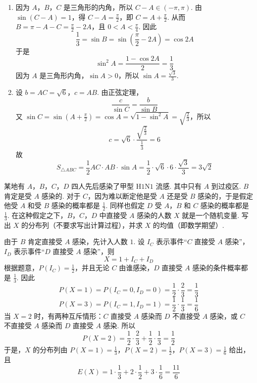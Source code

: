 \begin{solution}
\begin{enumerate}
\item 因为 \(A\)，\(B\)，\(C\) 是三角形的内角，所以 \(C-A\in(-\pi,\pi)\). 由 \(\sin(C-A)=1\)，得 \(C-A=\frac{\pi}{2}\)，即 \(C=A+\frac{\pi}{2}\). 从而 \(B=\pi-A-C=\frac{\pi}{2}-2A\)，且 \(0<A<\frac{\pi}{4}\). 因此
\[
\frac{1}{3}=\sin B=\sin\left(\frac{\pi}{2}-2A\right)=\cos 2A
\]
于是
\[
\sin^{2}A=\frac{1-\cos 2A}{2}=\frac{1}{3}
\]
因为 \(A\) 是三角形内角，\(\sin A>0\)，所以 \(\sin A=\frac{\sqrt{3}}{3}\).
\item 设 \(b=AC=\sqrt{6}\)，\(c=AB\). 由正弦定理，
\[
\frac{c}{\sin C}=\frac{b}{\sin B}
\]
又 \(\sin C=\sin\left(A+\frac{\pi}{2}\right)=\cos A=\sqrt{1-\sin^{2}A}=\sqrt{\frac{2}{3}}\)，所以
\[
c=\sqrt{6}\cdot\frac{\sqrt{\frac{2}{3}}}{\frac{1}{3}}=6
\]
故
\[
S_{\triangle ABC}=\frac{1}{2}AC\cdot AB\cdot\sin A
=\frac{1}{2}\cdot\sqrt{6}\cdot6\cdot\frac{\sqrt{3}}{3}=3\sqrt{2}
\]
\end{enumerate}
\end{solution}

\begin{problem}
某地有 \(A\)，\(B\)，\(C\)，\(D\) 四人先后感染了甲型 \(\mathrm{H1N1}\) 流感. 其中只有 \(A\) 到过疫区. \(B\) 肯定是受 \(A\) 感染的. 对于 \(C\)，因为难以断定他是受 \(A\) 还是受 \(B\) 感染的，于是假定他受 \(A\) 和受 \(B\) 感染的概率都是 \( \frac{1}{2} \). 同样也假定 \(D\) 受 \(A\)，\(B\) 和 \(C\) 感染的概率都是 \( \frac{1}{3} \). 在这种假定之下，\(B\)，\(C\)，\(D\) 中直接受 \(A\) 感染的人数 \(X\) 就是一个随机变量. 写出 \(X\) 的分布列（不要求写出计算过程），并求 \(X\) 的均值（即数学期望）.
\end{problem}

\begin{solution}
由于 \(B\) 肯定直接受 \(A\) 感染，先计入人数 \(1\). 设 \(I_C\) 表示事件“\(C\) 直接受 \(A\) 感染”，\(I_D\) 表示事件“\(D\) 直接受 \(A\) 感染”，则
\[
X=1+I_C+I_D
\]
根据题意，\(P(I_C)=\frac{1}{2}\)，并且无论 \(C\) 由谁感染，\(D\) 直接受 \(A\) 感染的条件概率都是 \(\frac{1}{3}\). 因此
\[
P(X=1)=P(I_C=0,I_D=0)=\frac{1}{2}\cdot\frac{2}{3}=\frac{1}{3}
\]
\[
P(X=3)=P(I_C=1,I_D=1)=\frac{1}{2}\cdot\frac{1}{3}=\frac{1}{6}
\]
当 \(X=2\) 时，有两种互斥情形：\(C\) 直接受 \(A\) 感染而 \(D\) 不直接受 \(A\) 感染，或 \(C\) 不直接受 \(A\) 感染而 \(D\) 直接受 \(A\) 感染. 所以
\[
P(X=2)=\frac{1}{2}\cdot\frac{2}{3}+\frac{1}{2}\cdot\frac{1}{3}=\frac{1}{2}
\]
于是，\(X\) 的分布列由
\(P(X=1)=\frac{1}{3}\)，\(P(X=2)=\frac{1}{2}\)，\(P(X=3)=\frac{1}{6}\)
给出，且
\[
E(X)=1\cdot\frac{1}{3}+2\cdot\frac{1}{2}+3\cdot\frac{1}{6}=\frac{11}{6}
\]
\end{solution}

